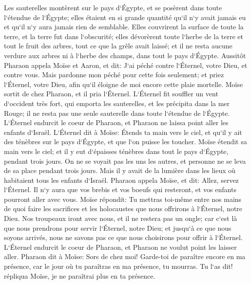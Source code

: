 \verse Les sauterelles montèrent sur le pays d`Égypte, et se posèrent dans toute l`étendue de l`Égypte; elles étaient en si grande quantité qu`il n`y avait jamais eu et qu`il n`y aura jamais rien de semblable. 
\verse Elles couvrirent la surface de toute la terre, et la terre fut dans l`obscurité; elles dévorèrent toute l`herbe de la terre et tout le fruit des arbres, tout ce que la grêle avait laissé; et il ne resta aucune verdure aux arbres ni à l`herbe des champs, dans tout le pays d`Égypte. 
\verse Aussitôt Pharaon appela Moïse et Aaron, et dit: J`ai péché contre l`Éternel, votre Dieu, et contre vous. 
\verse Mais pardonne mon péché pour cette fois seulement; et priez l`Éternel, votre Dieu, afin qu`il éloigne de moi encore cette plaie mortelle. 
\verse Moïse sortit de chez Pharaon, et il pria l`Éternel. 
\verse L`Éternel fit souffler un vent d`occident très fort, qui emporta les sauterelles, et les précipita dans la mer Rouge; il ne resta pas une seule sauterelle dans toute l`étendue de l`Égypte. 
\verse L`Éternel endurcit le coeur de Pharaon, et Pharaon ne laissa point aller les enfants d`Israël. 
\verse L`Éternel dit à Moïse: Étends ta main vers le ciel, et qu`il y ait des ténèbres sur le pays d`Égypte, et que l`on puisse les toucher. 
\verse Moïse étendit sa main vers le ciel; et il y eut d`épaisses ténèbres dans tout le pays d`Égypte, pendant trois jours. 
\verse On ne se voyait pas les uns les autres, et personne ne se leva de sa place pendant trois jours. Mais il y avait de la lumière dans les lieux où habitaient tous les enfants d`Israël. 
\verse Pharaon appela Moïse, et dit: Allez, servez l`Éternel. Il n`y aura que vos brebis et vos boeufs qui resteront, et vos enfants pourront aller avec vous. 
\verse Moïse répondit: Tu mettras toi-même entre nos mains de quoi faire les sacrifices et les holocaustes que nous offrirons à l`Éternel, notre Dieu. 
\verse Nos troupeaux iront avec nous, et il ne restera pas un ongle; car c`est là que nous prendrons pour servir l`Éternel, notre Dieu; et jusqu`à ce que nous soyons arrivés, nous ne savons pas ce que nous choisirons pour offrir à l`Éternel. 
\verse L`Éternel endurcit le coeur de Pharaon, et Pharaon ne voulut point les laisser aller. 
\verse Pharaon dit à Moïse: Sors de chez moi! Garde-toi de paraître encore en ma présence, car le jour où tu paraîtras en ma présence, tu mourras. 
\verse Tu l`as dit! répliqua Moïse, je ne paraîtrai plus en ta présence. 

\chapter{}

